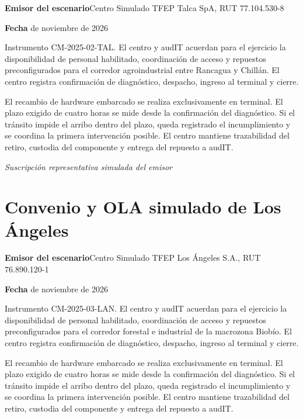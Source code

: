 \rotuloSimuladoSobreUno
\noindent\textbf{Emisor del escenario}\enspace Centro Simulado TFEP Talca SpA, RUT 77.104.530-8\par
\noindent\textbf{Fecha} de noviembre de 2026\par
\medskip

Instrumento CM-2025-02-TAL. El centro y audIT acuerdan para el ejercicio la disponibilidad de personal habilitado, coordinación de acceso y repuestos preconfigurados para el corredor agroindustrial entre Rancagua y Chillán. El centro registra confirmación de diagnóstico, despacho, ingreso al terminal y cierre.

El recambio de hardware embarcado se realiza exclusivamente en terminal. El plazo exigido de cuatro horas se mide desde la confirmación del diagnóstico. Si el tránsito impide el arribo dentro del plazo, queda registrado el incumplimiento y se coordina la primera intervención posible. El centro mantiene trazabilidad del retiro, custodia del componente y entrega del repuesto a audIT.

\medskip
\noindent\textit{Suscripción representativa simulada del emisor}\par
\label{adm:ola-ta-fin}

\clearpage
\section*{Convenio y OLA simulado de Los Ángeles}\label{adm:ola-la}

\rotuloSimuladoSobreUno
\noindent\textbf{Emisor del escenario}\enspace Centro Simulado TFEP Los Ángeles S.A., RUT 76.890.120-1\par
\noindent\textbf{Fecha} de noviembre de 2026\par
\medskip

Instrumento CM-2025-03-LAN. El centro y audIT acuerdan para el ejercicio la disponibilidad de personal habilitado, coordinación de acceso y repuestos preconfigurados para el corredor forestal e industrial de la macrozona Biobío. El centro registra confirmación de diagnóstico, despacho, ingreso al terminal y cierre.

El recambio de hardware embarcado se realiza exclusivamente en terminal. El plazo exigido de cuatro horas se mide desde la confirmación del diagnóstico. Si el tránsito impide el arribo dentro del plazo, queda registrado el incumplimiento y se coordina la primera intervención posible. El centro mantiene trazabilidad del retiro, custodia del componente y entrega del repuesto a audIT.


